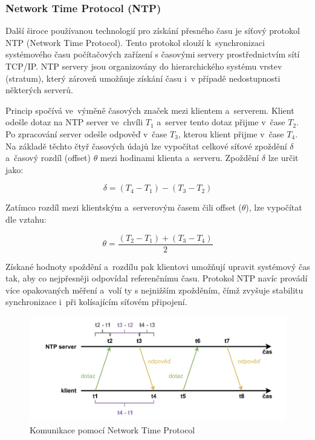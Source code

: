 \subsubsection{Network Time Protocol (NTP)}
Další široce používanou technologií pro získání přesného času je síťový protokol NTP (Network Time Protocol). Tento protokol slouží k~synchronizaci systémového času počítačových zařízení s časovými servery prostřednictvím sítí TCP/IP. NTP servery jsou organizovány do hierarchického systému vrstev (stratum), který zároveň umožňuje získání času i~v případě nedostupnosti některých serverů.

Princip spočívá ve~výměně časových značek mezi klientem a~serverem. Klient odešle dotaz na NTP server ve~chvíli $T_1$ a~server tento dotaz přijme v~čase $T_2$. Po zpracování server odešle odpověď v~čase $T_3$, kterou klient přijme v~čase $T_4$. Na základě těchto čtyř časových údajů lze vypočítat celkové síťové zpoždění $\delta$ a~časový rozdíl (offset) $\theta$ mezi hodinami klienta a~serveru. Zpoždění $\delta$ lze určit jako:

\[
    \delta = (T_4 - T_1) - (T_3 - T_2)
\]

    

Zatímco rozdíl mezi klientským a~serverovým časem čili offset ($\theta$), lze vypočítat dle vztahu:

\[
    \theta = \frac{(T_2 - T_1) + (T_3 - T_4)}{2}
\]

Získané hodnoty spoždění a~rozdílu pak klientovi umožňují upravit systémový čas tak, aby co nejpřesněji odpovídal referenčnímu času. Protokol NTP navíc provádí více opakovaných měření a~volí ty s nejnižším zpožděním, čímž zvyšuje stabilitu synchronizace i~při kolísajícím síťovém připojení.~\cite{sookocheff_ntp}

\begin{figure}[h]
    \centering
    \includegraphics[width=1.00\textwidth]{obrazky-figures/network_time_protocol.pdf}
    
    \caption{Komunikace pomocí Network Time Protocol~\cite{sookocheff_ntp}}
    \label{fig:network-time-protocol}
\end{figure}

